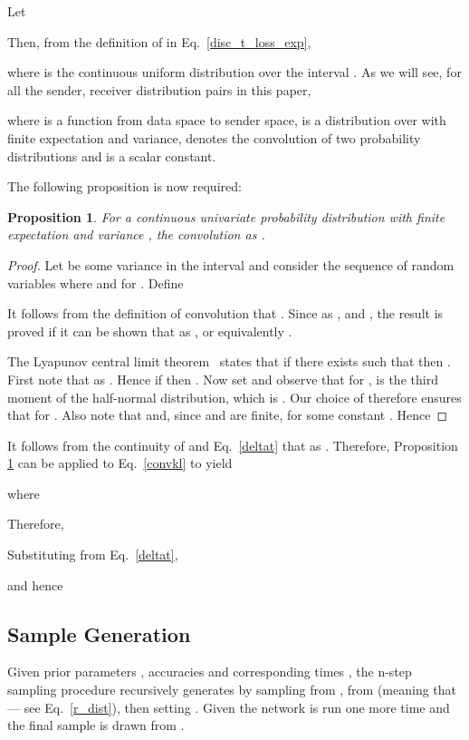 \documentclass[11pt,table]{article}
\newtheorem{proposition}[theorem]{Proposition}
\newcommand{\0}[1]{\constvec{0}{#1}}
\newcommand{\1}[1]{\constvec{1}{#1}}
\begin{document}
Let

Then, from the definition of  in Eq.~\ref{disc_t_loss_exp},

where  is the continuous uniform distribution over the interval .
As we will see, for all the sender, receiver distribution pairs in this paper,

where  is a function from data space to sender space,  is a distribution over  with finite expectation and variance,  denotes the convolution of two probability distributions and  is a scalar constant.

The following proposition is now required:
\begin{proposition}\label{proposition}
For a continuous univariate probability distribution  with finite expectation  and variance , the convolution  as .
\end{proposition}

\begin{proof}
Let  be some variance in the interval  and consider the sequence of random variables  where  and  for . Define

It follows from the definition of convolution that . 
Since  as , and , the result is proved if it can be shown that as ,  or equivalently .

\sloppy The Lyapunov central limit theorem~\citep{georgii2008stochastics} states that if there exists  such that  then .
First note that  as .
Hence if  then .
Now set  and observe that for ,  is the third moment of the half-normal distribution, which is .
Our choice of  therefore ensures that  for .
Also note that  and, since  and  are finite,  for some constant .
Hence

\end{proof}
It follows from the continuity of  and Eq.~\ref{deltat} that  as .
Therefore, Proposition \ref{proposition} can be applied to Eq.~\ref{convkl} to yield

where 

Therefore,

Substituting from Eq.~\ref{deltat},

and hence

\subsection{Sample Generation}
Given prior parameters , accuracies  and corresponding times , the n-step sampling procedure recursively generates  by sampling  from , 
 from  (meaning that  --- see Eq.~\ref{r_dist}), then setting 
.
Given  the network is run one more time and the final sample is drawn from .
\end{document}
